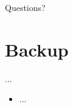 \documentclass[t]{beamer} %
\begin{document}



\begin{frame}[standout]
  Questions?
\end{frame}


\appendix
{}
\section{Backup}
\begin{frame}{...}
  \begin{itemize}
    \item ...
  \end{itemize}
\end{frame}
\end{document}

